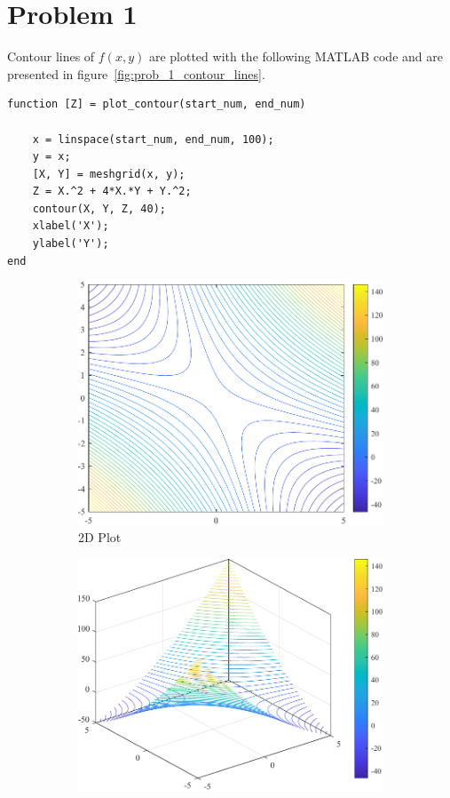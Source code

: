 \section{Problem 1}

Contour lines of $f(x,y)$ are plotted with the following MATLAB code and are presented in figure~\ref{fig:prob_1_contour_lines}.

\begin{lstlisting}[]
function [Z] = plot_contour(start_num, end_num)
	
	x = linspace(start_num, end_num, 100);
	y = x;
	[X, Y] = meshgrid(x, y);
	Z = X.^2 + 4*X.*Y + Y.^2;
	contour(X, Y, Z, 40);
	xlabel('X');
	ylabel('Y');
end
\end{lstlisting}
\begin{figure}[h]
	\centering
	\begin{subfigure}{0.4\textwidth}
		\includegraphics[width=\textwidth]{../Problem 1/contour_lines_2d.pdf}
		\caption{2D Plot}
		\label{fig:prob_1_contour_lines_2d}
	\end{subfigure}
	\begin{subfigure}{0.4\textwidth}
		\includegraphics[width=\textwidth]{../Problem 1/contour_lines_3d.pdf}

\end{subfigure}
\end{figure}
